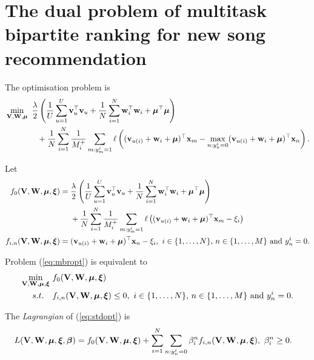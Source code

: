 \section{The dual problem of multitask bipartite ranking for new song recommendation}

The optimisation problem is
\begin{equation}
\label{eq:mbropt}
\begin{aligned}
&\min_{\mathbf{V}, \mathbf{W}, \bm{\mu}} \ \frac{\lambda}{2} \left( \frac{1}{U} \sum_{u=1}^U \mathbf{v}_u^\top \mathbf{v}_u 
     + \frac{1}{N} \sum_{i=1}^N \mathbf{w}_i^\top \mathbf{w}_i + \bm{\mu}^\top \bm{\mu} \right) \\
& \hspace{4em}
     + \frac{1}{N} \sum_{i=1}^N \frac{1}{M_i^+} \sum_{m: y_m^i = 1} \ell \left( (\mathbf{v}_{u(i)} + \mathbf{w}_i + \bm{\mu})^\top \mathbf{x}_m 
     - \max_{n: y_n^i = 0} (\mathbf{v}_{u(i)} + \mathbf{w}_i + \bm{\mu})^\top \mathbf{x}_n \right).
\end{aligned}
\end{equation}

Let 
\begin{equation*}
\begin{aligned}
f_0(\V, \W, \mubm, \xibm) &= \frac{\lambda}{2} \left( \frac{1}{U} \sum_{u=1}^U \bv_u^\top \bv_u 
     + \frac{1}{N} \sum_{i=1}^N \w_i^\top \w_i + \mubm^\top \mubm \right) \\
& \quad \ 
     + \frac{1}{N} \sum_{i=1}^N \frac{1}{M_i^+} \sum_{m: y_m^i = 1} 
       \ell \left( (\bv_{u(i)} + \w_i + \mubm)^\top \x_m - \xi_i \right) \\
f_{i,n} (\V, \W, \mubm, \xibm) &= (\bv_{u(i)} + \w_i + \mubm)^\top \x_n - \xi_i, \
i \in \{1,\dots,N\}, \, n \in \{1,\dots,M\} \ \mathrm{and} \ y_n^i = 0.
\end{aligned}
\end{equation*}

Problem (\ref{eq:mbropt}) is equivalent to 
\begin{equation}
\label{eq:stdopt}
\begin{aligned}
\min_{\mathbf{V}, \mathbf{W}, \bm{\mu}, \bm{\xi}} \ & f_0(\mathbf{V}, \mathbf{W}, \bm{\mu}, \bm{\xi}) \\
s.t. \quad & f_{i,n}(\mathbf{V}, \mathbf{W}, \bm{\mu}, \bm{\xi}) \le 0, \
i \in \{1,\dots,N\}, \, n \in \{1,\dots,M\} \ \mathrm{and} \ y_n^i = 0.
\end{aligned}
\end{equation}

The \emph{Lagrangian} of (\ref{eq:stdopt}) is
\begin{equation*}
\begin{aligned}
L(\mathbf{V}, \mathbf{W}, \bm{\mu}, \bm{\xi}, {\bm{\beta}}) 
&= f_0(\mathbf{V}, \mathbf{W}, \bm{\mu}, \bm{\xi}) + \sum_{i=1}^N \sum_{n: y_n^i = 0} \beta_i^n f_{i,n} (\mathbf{V}, \mathbf{W}, \bm{\mu}, \bm{\xi}), \
\beta_i^n \ge 0.
\end{aligned}
\end{equation*}

